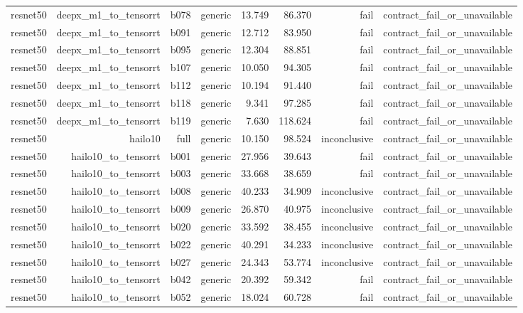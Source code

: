 \begin{table}[t]
\begin{tabular}{lrrrrrrr}
resnet50 & deepx\_m1\_to\_tensorrt & b078 & generic & 13.749 & 86.370 & fail & contract\_fail\_or\_unavailable \\
resnet50 & deepx\_m1\_to\_tensorrt & b091 & generic & 12.712 & 83.950 & fail & contract\_fail\_or\_unavailable \\
resnet50 & deepx\_m1\_to\_tensorrt & b095 & generic & 12.304 & 88.851 & fail & contract\_fail\_or\_unavailable \\
resnet50 & deepx\_m1\_to\_tensorrt & b107 & generic & 10.050 & 94.305 & fail & contract\_fail\_or\_unavailable \\
resnet50 & deepx\_m1\_to\_tensorrt & b112 & generic & 10.194 & 91.440 & fail & contract\_fail\_or\_unavailable \\
resnet50 & deepx\_m1\_to\_tensorrt & b118 & generic & 9.341 & 97.285 & fail & contract\_fail\_or\_unavailable \\
resnet50 & deepx\_m1\_to\_tensorrt & b119 & generic & 7.630 & 118.624 & fail & contract\_fail\_or\_unavailable \\
resnet50 & hailo10 & full & generic & 10.150 & 98.524 & inconclusive & contract\_fail\_or\_unavailable \\
resnet50 & hailo10\_to\_tensorrt & b001 & generic & 27.956 & 39.643 & fail & contract\_fail\_or\_unavailable \\
resnet50 & hailo10\_to\_tensorrt & b003 & generic & 33.668 & 38.659 & fail & contract\_fail\_or\_unavailable \\
resnet50 & hailo10\_to\_tensorrt & b008 & generic & 40.233 & 34.909 & inconclusive & contract\_fail\_or\_unavailable \\
resnet50 & hailo10\_to\_tensorrt & b009 & generic & 26.870 & 40.975 & inconclusive & contract\_fail\_or\_unavailable \\
resnet50 & hailo10\_to\_tensorrt & b020 & generic & 33.592 & 38.455 & inconclusive & contract\_fail\_or\_unavailable \\
resnet50 & hailo10\_to\_tensorrt & b022 & generic & 40.291 & 34.233 & inconclusive & contract\_fail\_or\_unavailable \\
resnet50 & hailo10\_to\_tensorrt & b027 & generic & 24.343 & 53.774 & inconclusive & contract\_fail\_or\_unavailable \\
resnet50 & hailo10\_to\_tensorrt & b042 & generic & 20.392 & 59.342 & fail & contract\_fail\_or\_unavailable \\
resnet50 & hailo10\_to\_tensorrt & b052 & generic & 18.024 & 60.728 & fail & contract\_fail\_or\_unavailable \\

\end{tabular}
\end{table}
